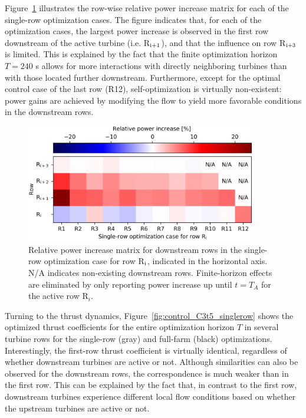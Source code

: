 	Figure~\ref{fig:gains_singlerow} illustrates the row-wise relative power increase matrix for each of the single-row optimization cases. The figure indicates that, for each of the optimization cases, the largest power increase is observed in the first row downstream of the active turbine (i.e. R$_{\rm i+1}$), and that the influence on row R$_{\rm i+3}$ is limited. This is explained by the fact that the finite optimization horizon $T = 240$ s allows for more interactions with directly neighboring turbines than with those located further downstream. Furthermore, except for the optimal control case of the last row (R12), self-optimization is virtually non-existent: power gains are achieved by modifying the flow to yield more favorable conditions in the downstream rows. 

	\begin{figure}
		\centering
		\includegraphics[width=0.9\textwidth]{chapters/analysis_induction_control/individual_gains.eps}
		\caption[Relative power increase matrix for downstream rows in the single-row optimization case for row R$_{\rm i}$.]{Relative power increase matrix for downstream rows in the single-row optimization case for row R$_{\rm i}$, indicated in the horizontal axis. N/A indicates non-existing downstream rows. Finite-horizon effects are eliminated by only reporting power increase up until $t = T_A$ for the active row R$_i$. \label{fig:gains_singlerow}}
	\end{figure}

	Turning to the thrust dynamics, Figure~\ref{fig:control_C3t5_singlerow} shows the optimized thrust coefficients for the entire optimization horizon $T$ in several turbine rows for the single-row (gray) and full-farm (black) optimizations. Interestingly, the first-row thrust coefficient is virtually identical, regardless of whether downstream turbines are active or not. Although similarities can also be observed for the downstream rows, the correspondence is much weaker than in the first row. This can be explained by the fact that, in contrast to the first row, downstream turbines experience different local flow conditions based on whether the upstream turbines are active or not.
	
